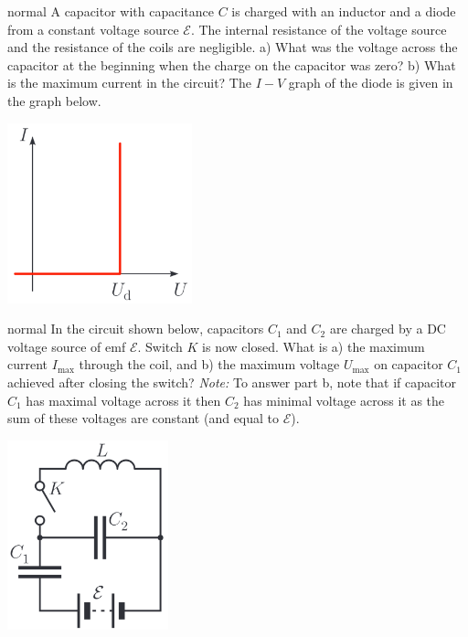 \hypertarget{P150}{}
\begin{solution}{normal} %
A capacitor with capacitance $C$ is charged with an inductor and a diode from a constant voltage source $\mathcal{E}$. The internal resistance of the voltage source and the resistance of the coils are negligible. a) What was the voltage across the capacitor at the beginning when the charge on the capacitor was zero? b) What is the maximum current in the circuit? The $I-V$ graph of the diode is given in the graph below.
\begin{center}
    \includegraphics[width=0.4\textwidth]{S1 Figures/S1-35-2.png}
\end{center}
\end{solution}

\hypertarget{P151}{}
\begin{solution}{normal} %
In the circuit shown below, capacitors $C_1$ and $C_2$ are charged by a DC voltage source of emf $\mathcal{E}$. Switch $K$ is now closed. What is a) the maximum current $I_\text{max}$ through the coil, and b) the maximum voltage $U_\text{max}$ on capacitor $C_1$ achieved after closing the switch? \textit{Note:} To answer part b, note that if capacitor $C_1$ has maximal voltage across it then $C_2$ has minimal voltage across it as the sum of these voltages are constant (and equal to $\mathcal{E}$).
\begin{center}
    \includegraphics[width=0.35\textwidth]{S5 Figures/S5-151.png}
\end{center}
\end{solution}